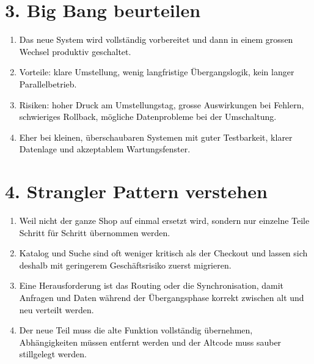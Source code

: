 \documentclass[11pt,a4paper]{article}
\newcommand{\solution}[1]{\textcolor{black}{#1}}
\begin{document}
\section*{3. Big Bang beurteilen}
\begin{enumerate}
  \item \solution{Das neue System wird vollständig vorbereitet und dann in einem grossen Wechsel produktiv geschaltet.}
  \item \solution{Vorteile: klare Umstellung, wenig langfristige Übergangslogik, kein langer Parallelbetrieb.}
  \item \solution{Risiken: hoher Druck am Umstellungstag, grosse Auswirkungen bei Fehlern, schwieriges Rollback, mögliche Datenprobleme bei der Umschaltung.}
  \item \solution{Eher bei kleinen, überschaubaren Systemen mit guter Testbarkeit, klarer Datenlage und akzeptablem Wartungsfenster.}
\end{enumerate}

\section*{4. Strangler Pattern verstehen}
\begin{enumerate}
  \item \solution{Weil nicht der ganze Shop auf einmal ersetzt wird, sondern nur einzelne Teile Schritt für Schritt übernommen werden.}
  \item \solution{Katalog und Suche sind oft weniger kritisch als der Checkout und lassen sich deshalb mit geringerem Geschäftsrisiko zuerst migrieren.}
  \item \solution{Eine Herausforderung ist das Routing oder die Synchronisation, damit Anfragen und Daten während der Übergangsphase korrekt zwischen alt und neu verteilt werden.}
  \item \solution{Der neue Teil muss die alte Funktion vollständig übernehmen, Abhängigkeiten müssen entfernt werden und der Altcode muss sauber stillgelegt werden.}
\end{enumerate}
\end{document}
